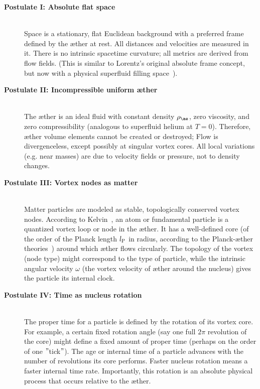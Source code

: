 \begin{description}
    \item[\textbf{Postulate I: Absolute flat space}] \hfill \\
    Space is a stationary, flat Euclidean background with a preferred frame defined by the æther at rest. All distances and velocities are measured in it. There is no intrinsic spacetime curvature; all metrics are derived from flow fields. (This is similar to Lorentz's original absolute frame concept, but now with a physical superfluid filling space~\cite{Winterberg2002-PlanckÆther}).

    \item[\textbf{Postulate II: Incompressible uniform æther}] \hfill \\
    The æther is an ideal fluid with constant density $\rho_{\ae}$, zero viscosity, and zero compressibility (analogous to superfluid helium at $T=0$). Therefore, æther volume elements cannot be created or destroyed; Flow is divergenceless, except possibly at singular vortex cores. All local variations (e.g. near masses) are due to velocity fields or pressure, not to density changes.

    \item[\textbf{Postulate III: Vortex nodes as matter}] \hfill \\
    Matter particles are modeled as stable, topologically conserved vortex nodes. According to Kelvin~\cite{Kelvin1867-vortex}, an atom or fundamental particle is a quantized vortex loop or node in the æther. It has a well-defined core (of the order of the Planck length $l_{\textrm P}$ in radius, according to the Planck-æther theories~\cite{Winterberg2002-PlanckÆther}) around which æther flows circularly. The topology of the vortex (node type) might correspond to the type of particle, while the intrinsic angular velocity $\omega$ (the vortex velocity of æther around the nucleus) gives the particle its internal clock.

    \item[\textbf{Postulate IV: Time as nucleus rotation}] \hfill \\
    The proper time for a particle is defined by the rotation of its vortex core. For example, a certain fixed rotation angle (say one full $2\pi$ revolution of the core) might define a fixed amount of proper time (perhaps on the order of one \("\)tick\("\)). The age or internal time of a particle advances with the number of revolutions its core performs. Faster nucleus rotation means a faster internal time rate. Importantly, this rotation is an absolute physical process that occurs relative to the æther.


\end{description}
